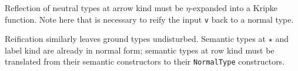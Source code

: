 \documentclass[authoryear, acmsmall, screen, review, nonacm]{acmart}
\begin{document}
\Ni Reflection of neutral types at arrow kind must be $\eta$-expanded into a Kripke function. Note here that is necessary to reify the input \verb!v! back to a normal type.

\begin{code}%
\>[0]\AgdaSpace{}%
\AgdaSymbol{\{}\AgdaSpace{}%
\AgdaSymbol{=}\AgdaSpace{}%
\AgdaSpace{}%
\AgdaSpace{}%
\AgdaSymbol{\}}\AgdaSpace{}%
%
\>[29]\AgdaSymbol{=}\AgdaSpace{}%
\AgdaSpace{}%
\AgdaSpace{}%
\AgdaSpace{}%
\AgdaSpace{}%
\AgdaSpace{}%
\AgdaSymbol{(}\AgdaSpace{}%
\AgdaSpace{}%
\AgdaSpace{}%
\AgdaSpace{}%
\AgdaSpace{}%
\AgdaSymbol{)}\<%
\end{code}

\Ni Reification similarly leaves ground types undisturbed. Semantic types at $\star$ and label kind are already in normal form; semantic types at row kind must be translated from their semantic constructors to their \verb!NormalType! constructors.
\end{document}
